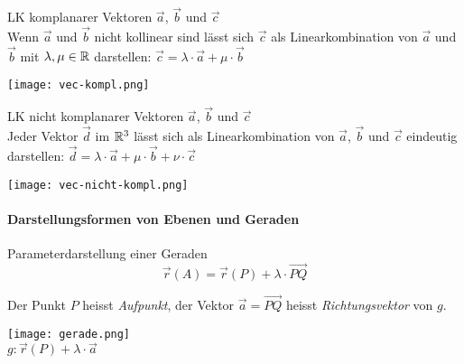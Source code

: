 \begin{minipage}{0.7\linewidth}
    \begin{theorem}{LK komplanarer Vektoren} $\vec{a}$, $\vec{b}$ und $\vec{c}$\\
        Wenn $\vec{a}$ und $\vec{b}$ nicht kollinear sind lässt sich $\vec{c}$ als Linearkombination von $\vec{a}$ und $\vec{b}$ mit $\lambda, \mu \in \mathbb{R}$ darstellen:
            {\large$\vec{c}=\lambda\cdot\vec{a}+\mu\cdot\vec{b}$}
    \end{theorem}
    \end{minipage}
    \begin{minipage}{0.25\linewidth}
        \texttt{[image: vec-kompl.png]}
\end{minipage}

\begin{minipage}{0.7\linewidth}
    \begin{theorem}{LK nicht komplanarer Vektoren} $\vec{a}$, $\vec{b}$ und $\vec{c}$\\
        Jeder Vektor $\vec{d}$ im $\mathbb{R}^3$ lässt sich als Linearkombination von $\vec{a}$, $\vec{b}$ und $\vec{c}$ eindeutig darstellen:
            {\large$\vec{d}=\lambda\cdot\vec{a}+\mu\cdot\vec{b}+\nu\cdot\vec{c}$}
    \end{theorem}
    \end{minipage}
    \begin{minipage}{0.25\linewidth}
        \texttt{[image: vec-nicht-kompl.png]}
\end{minipage}

\paragraph{Darstellungsformen von Ebenen und Geraden}

\begin{minipage}{0.6\linewidth}
    \begin{definition}{Parameterdarstellung} einer Geraden
        $$\overrightarrow{r}(A) = \overrightarrow{r}(P) + \lambda \cdot \overrightarrow{PQ}$$
    
        {\small Der Punkt $P$ heisst \textit{Aufpunkt}, der Vektor $\overrightarrow{a} = \overrightarrow{PQ}$ heisst \textit{Richtungsvektor} von $g$.}
    \end{definition}
\end{minipage}
\begin{minipage}{0.4\linewidth}
    \texttt{[image: gerade.png]}\\
    $g: \overrightarrow{r}(P) + \lambda \cdot \overrightarrow{a}$
\end{minipage}


